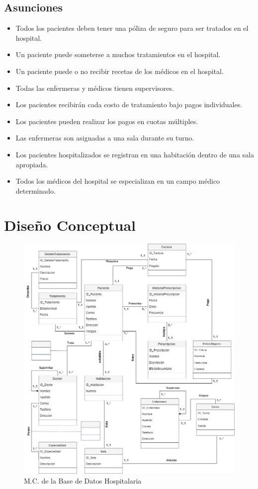\documentclass[10pt,letterpaper]{book}
\begin{document}
\subsection*{Asunciones}
\begin{itemize}
\item Todos los pacientes deben tener una póliza de seguro para ser tratados en el hospital.
\item Un paciente puede someterse a muchos tratamientos en el hospital.
\item Un paciente puede o no recibir recetas de los médicos en el hospital.
\item Todas las enfermeras y médicos tienen supervisores.
\item Los pacientes recibirán cada costo de tratamiento bajo pagos individuales.
\item Los pacientes pueden realizar los pagos en cuotas múltiples.
\item Las enfermeras son asignadas a una sala durante su turno.
\item Los pacientes hospitalizados se registran en una habitación dentro de una sala apropiada.
\item Todos los médicos del hospital se especializan en un campo médico determinado.
\end{itemize}
\pagebreak
\section*{Diseño Conceptual}
\vspace{-5cm}
\begin{figure}[h!]
\includegraphics[width=15cm]{DConceptual} 
\caption{M.C. de la Base de Datos Hospitalaria}
\end{figure}
\pagebreak
\end{document}
